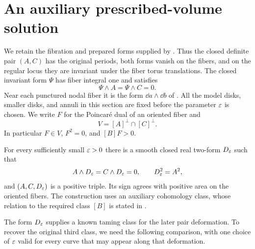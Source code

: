 \section{An auxiliary prescribed-volume solution}
\label{sec:auxiliary-volume}

We retain the fibration and prepared forms supplied by
.  Thus the closed definite pair $(A,C)$ has
the original periods, both forms vanish on the fibers, and on the regular
locus they are invariant under the fiber torus translations.  The closed
invariant form $\Psi$ has fiber integral one and satisfies
\begin{equation}
  \Psi\wedge A=\Psi\wedge C=0.
  \label{eq:auxiliary-prepared-orthogonality}
\end{equation}
Near each punctured nodal fiber it is the form $\dd a\wedge\dd b$ of
.  All the model disks, smaller disks, and annuli in
this section are fixed before the parameter $\varepsilon$ is chosen.  We write
$F$ for the Poincar\'e dual of an oriented fiber and
\[
  V=[A]^\perp\cap[C]^\perp.
\]
In particular $F\in V$, $F^2=0$, and $[B]F>0$.

\begin{theorem}
\label{thm:auxiliary-solution}
For every sufficiently small $\varepsilon>0$ there is a smooth closed real
two-form $D_\varepsilon$ such that
\begin{equation}
  A\wedge D_\varepsilon=C\wedge D_\varepsilon=0,
  \qquad D_\varepsilon^2=A^2,
  \label{eq:auxiliary-exact-equations}
\end{equation}
and $(A,C,D_\varepsilon)$ is a positive triple.  Its sign agrees with positive
area on the oriented fibers.  The construction uses an auxiliary
cohomology class, whose relation to the required class $[B]$ is stated in
.
\end{theorem}

The form $D_\varepsilon$ supplies a known taming class for the later pair
deformation.  To recover the original third class, we need the following
comparison, with one choice of $\varepsilon$ valid for every curve that may
appear along that deformation.

